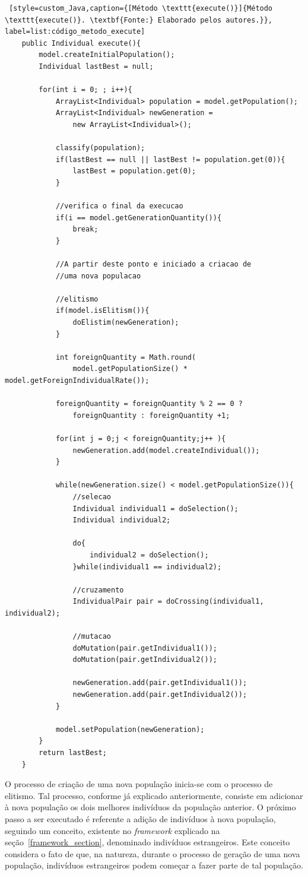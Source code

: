 \begin{lstlisting} [style=custom_Java,caption={[Método \texttt{execute()}]{Método \texttt{execute()}. \textbf{Fonte:} Elaborado pelos autores.}}, label=list:código_metodo_execute] 
	public Individual execute(){
		model.createInitialPopulation();
		Individual lastBest = null;
		
		for(int i = 0; ; i++){
			ArrayList<Individual> population = model.getPopulation();
			ArrayList<Individual> newGeneration = 
				new ArrayList<Individual>();
			
			classify(population);
			if(lastBest == null || lastBest != population.get(0)){
				lastBest = population.get(0);
			}
			
			//verifica o final da execucao
			if(i == model.getGenerationQuantity()){
				break;
			}
			
			//A partir deste ponto e iniciado a criacao de 
			//uma nova populacao
			
			//elitismo
			if(model.isElitism()){
				doElistim(newGeneration);
			}
			
			int foreignQuantity = Math.round(
				model.getPopulationSize() * model.getForeignIndividualRate());
			
			foreignQuantity = foreignQuantity % 2 == 0 ? 
				foreignQuantity : foreignQuantity +1;
			
			for(int j = 0;j < foreignQuantity;j++ ){
				newGeneration.add(model.createIndividual());
			}
			
			while(newGeneration.size() < model.getPopulationSize()){
				//selecao
				Individual individual1 = doSelection();
				Individual individual2;
				
				do{
					individual2 = doSelection();
				}while(individual1 == individual2);
				
				//cruzamento
				IndividualPair pair = doCrossing(individual1, individual2);
				
				//mutacao
				doMutation(pair.getIndividual1());
				doMutation(pair.getIndividual2());
				
				newGeneration.add(pair.getIndividual1());
				newGeneration.add(pair.getIndividual2());
			}
			
			model.setPopulation(newGeneration);
		}
		return lastBest;
	}

\end{lstlisting}

\par O processo de criação de uma nova população inicia-se com o processo de elitismo. Tal processo, conforme já explicado
anteriormente, consiste em adicionar à nova população os dois melhores indivíduos da população anterior. O próximo
passo a ser executado é referente a adição de indivíduos à nova população, seguindo um conceito, existente no \textit{framework} explicado 
na seção~\ref{framework_section}, denominado indivíduos estrangeiros. Este conceito considera o fato de que, na natureza, durante o processo de geração de uma nova população, indivíduos estrangeiros podem começar a fazer parte de tal população. 

